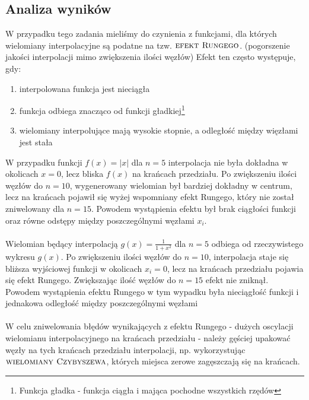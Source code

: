 \subsection{Analiza wyników}
W przypadku tego zadania mieliśmy do czynienia z funkcjami, dla których wielomiany interpolacyjne są podatne na tzw. $\textsc{efekt Rungego}$. (pogorszenie jakości interpolacji mimo zwiększenia ilości węzłów) Efekt ten często występuje, gdy:
\begin{enumerate}
    \item interpolowana funkcja jest nieciągła
    \item funkcja odbiega znacząco od funkcji gładkiej\footnote{Funkcja gładka - funkcja ciągła i mająca pochodne wszystkich rzędów}
    \item wielomiany interpolujące mają wysokie stopnie, a odległość między więzłami jest stała
\end{enumerate}
W przypadku funkcji $f(x) = |x|$ dla $n = 5$ interpolacja nie była dokładna w okolicach $x = 0$, lecz bliska $f(x)$ na krańcach przedziału. Po zwiększeniu ilości węzłów do $n = 10$, wygenerowany wielomian był bardziej dokładny w centrum, lecz na krańcach pojawił się wyżej wspomniany efekt Rungego, który nie został zniwelowany dla $n = 15$. Powodem wystąpienia efektu był brak ciągłości funkcji oraz równe odstępy między poszczególnymi węzłami $x_i$. \\\\
Wielomian będący interpolacją $g(x) = \frac{1}{1 + x^2}$ dla $n = 5$ odbiega od rzeczywistego wykresu $g(x)$. Po zwiększeniu ilości węzłów do $n = 10$, interpolacja staje się bliższa wyjściowej funkcji w okolicach $x_i = 0$, lecz na krańcach przedziału pojawia się efekt Rungego. Zwiększając ilość węzłów do $n = 15$ efekt nie zniknął. Powodem wystąpienia efektu Rungego w tym wypadku była nieciągłość funkcji i jednakowa odległość między poszczególnymi węzłami 
\\\\
W celu zniwelowania błędów wynikających z efektu Rungego - dużych oscylacji wielomianu interpolacyjnego na krańcach przedziału - należy gęściej upakować węzły na tych krańcach przedziału interpolacji, np. wykorzystując $\textsc{wielomiany Czybyszewa}$, których miejsca zerowe zagęszczają się na krańcach.